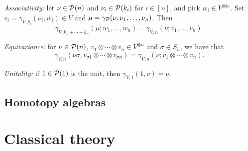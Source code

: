 \begin{tenumerate}
\item \emph{Associativity:} let $\nu\in {\mathcal{P}}(n)$ and
$\nu_i \in {\mathcal{P}}(k_i)$ for $i\in [n]$, and pick
$w_i \in V^{\otimes k_i}$. Set $v_i = \gamma_{V,k_i}(\nu_i,w_i) \in V$
and $\mu = \gamma_{\mathcal{P}}(\nu;\nu_1,\ldots,\nu_n)$. Then 
\[ \gamma_{V,k_1+\cdots+k_n}(\mu; w_1,\ldots,w_n) = 
	\gamma_{V,n}(\nu ;v_1,\ldots, v_n).\]
\item \emph{Equivariance:} for $\nu\in{\mathcal{P}}(n)$, $v_1\otimes\cdots \otimes v_n \in V^{\otimes n}$
and $\sigma\in S_n$, we have that
\[ \gamma_{V,n}(\nu \sigma, v_{\sigma 1} \otimes \cdots \otimes v_{\sigma n}) = \gamma_{V,n}(\nu; v_1\otimes\cdots \otimes v_n). \]
\item \emph{Unitality:} if $1\in{\mathcal{P}}(1)$ is the unit, then
$\gamma_{V,1}(1,v) = v$.  
\end{tenumerate}



\subsection{Homotopy algebras}

\pagebreak


\section{Classical theory}

